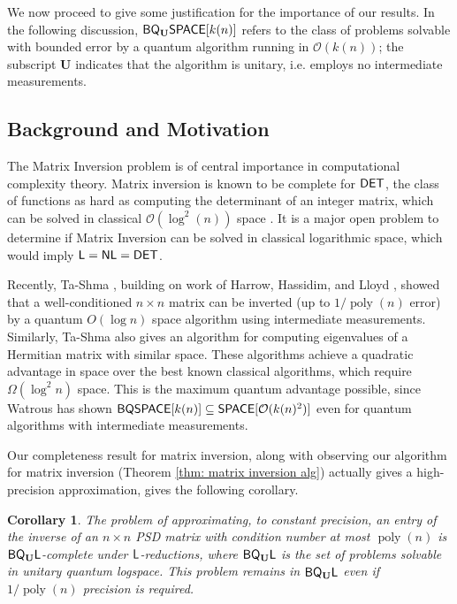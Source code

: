 \documentclass[11pt]{article}
\newtheorem{corollary}[theorem]{Corollary}
\theoremstyle{definition}
\theoremstyle{remark}
\newcommand\DET{{\sf{DET}}}
\newcommand\DSPACE{{\sf{SPACE}}}
\newcommand\BQSPACE{{\sf{BQSPACE}}}
\newcommand\Logspace{{\sf{L}}}
\newcommand\NL{{\sf{NL}}}
\newcommand{\classfont}{\sf}
\newcommand{\Unitary}{\mathbf{U}}
\newcommand{\unitaryBQL}{{\classfont{BQ}_\Unitary\classfont{L}}}
\newcommand{\unitaryBQSPACE}[1]{{\classfont{BQ}_\Unitary\classfont{SPACE}}[#1]}
\newcommand\bigoh{\mathcal{O}}
\DeclareMathOperator{\poly}{poly}
\begin{document}
We now proceed to give some justification for the importance of our results.  In the following discussion, $\unitaryBQSPACE{k(n)}$ refers to the class of problems solvable with bounded error by a quantum algorithm running in $\mathcal{O}(k(n))$; the subscript $\Unitary$ indicates that the algorithm is unitary, i.e. employs no intermediate measurements.

\subsection{Background and Motivation}
The Matrix Inversion problem is of central importance in computational complexity theory.  Matrix inversion is known to be complete for $\DET$, the class of functions as hard as computing the determinant of an integer matrix, which can be solved in classical $\mathcal{O}(\log^{2}(n))$ space \cite{berkowitz, cook}. It is a major open problem to determine if Matrix Inversion can be solved in classical logarithmic space, which would imply $\Logspace=\NL=\DET$.
 
Recently, Ta-Shma \cite{tashma}, building on work of Harrow, Hassidim, and Lloyd \cite{HHL}, showed that a well-conditioned $n \times n$ matrix can be inverted (up to $1/\poly(n)$ error) by a quantum $O(\log n)$ space algorithm using intermediate measurements. Similarly, Ta-Shma also gives an algorithm for computing eigenvalues of a Hermitian matrix with similar space. These algorithms achieve a quadratic advantage in space over the best known classical algorithms, which require $\Omega(\log^2n)$ space.  This is the maximum quantum advantage possible, since Watrous has shown $\BQSPACE[k(n)]\subseteq\DSPACE[\bigoh(k(n)^2)]$ \cite{Watrous99,Watrous03} even for quantum algorithms with intermediate measurements.

Our completeness result for matrix inversion, along with observing our algorithm for matrix inversion (Theorem \ref{thm: matrix inversion alg}) actually gives a high-precision approximation, gives the following corollary.\begin{corollary}
The problem of approximating, to constant precision, an entry of the inverse of an $n \times n$ PSD matrix with condition number at most $\poly(n)$ is $\unitaryBQL$-complete under $\Logspace$-reductions, where $\unitaryBQL$ is the set of problems solvable in unitary quantum logspace. This problem remains in $\unitaryBQL$ even if $1/\poly(n)$ precision is required.
\end{corollary}
\end{document}
